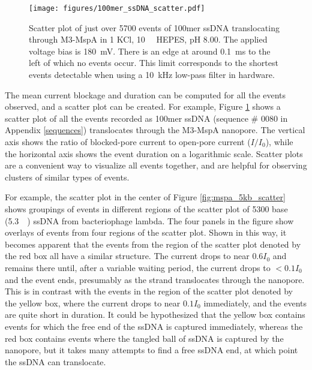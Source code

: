 \begin{figure}[h]
\begin{centering}
\texttt{[image: figures/100mer\_ssDNA\_scatter.pdf]}
\caption[Scatter plot of 100mer ssDNA in MspA]{Scatter plot of just over 5700 events of 100mer ssDNA translocating through M3-MspA in \SI{1}{\Molar} KCl, \SI{10}{\milli\Molar} HEPES, pH \num{8.00}.  The applied voltage bias is \SI{180}{\mV}.  There is an edge at around \SI{0.1}{ms} to the left of which no events occur.  This limit corresponds to the shortest events detectable when using a \SI{10}{\kHz} low-pass filter in hardware.}
\label{fig:mspa_100mer_scatter}
\end{centering}
\end{figure}

The mean current blockage and duration can be computed for all the events observed, and a scatter plot can be created.  For example, Figure \ref{fig:mspa_100mer_scatter} shows a scatter plot of all the events recorded as \num{100}mer ssDNA (sequence \# 0080 in Appendix \ref{sequences}) translocates through the M3-MspA nanopore.  The vertical axis shows the ratio of blocked-pore current to open-pore current ($I/I_0$), while the horizontal axis shows the event duration on a logarithmic scale.  Scatter plots are a convenient way to visualize all events together, and are helpful for observing clusters of similar types of events.

For example, the scatter plot in the center of Figure \ref{fig:mspa_5kb_scatter} shows groupings of events in different regions of the scatter plot of \num{5300} base (\SI{5.3}{\kilo\base}) ssDNA from bacteriophage lambda.  The four panels in the figure show overlays of events from four regions of the scatter plot.  Shown in this way, it becomes apparent that the events from the region of the scatter plot denoted by the red box all have a similar structure.  The current drops to near $0.6 I_0$ and remains there until, after a variable waiting period, the current drops to $<0.1 I_0$ and the event ends, presumably as the strand translocates through the nanopore.  This is in contrast with the events in the region of the scatter plot denoted by the yellow box, where the current drops to near $0.1 I_0$ immediately, and the events are quite short in duration.  It could be hypothesized that the yellow box contains events for which the free end of the ssDNA is captured immediately, whereas the red box contains events where the tangled ball of ssDNA is captured by the nanopore, but it takes many attempts to find a free ssDNA end, at which point the ssDNA can translocate.


